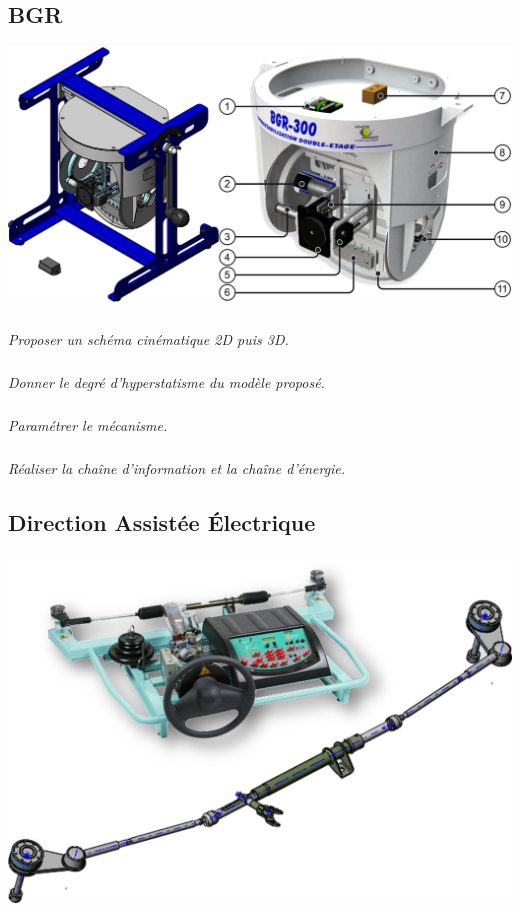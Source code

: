 \documentclass[10pt,fleqn]{article} %
\begin{document}

\vspace{4.5cm}
\pagestyle{fancy}
\thispagestyle{plain}


\def\columnseprulecolor{\color{ocre}}
\setlength{\columnseprule}{0.4pt} 

\begin{multicols}{2}
\subsection*{BGR}
\setcounter{exo}{0}

\begin{center}
\includegraphics[width=\linewidth]{images/bgr_01}
\end{center}

\subparagraph{}
\textit{Proposer un schéma cinématique 2D puis 3D.}

\subparagraph{}
\textit{Donner le degré d’hyperstatisme du modèle proposé.}


\subparagraph{}
\textit{Paramétrer le mécanisme.}


\subparagraph{}
\textit{Réaliser la chaîne d'information et la chaîne d'énergie.}






\subsection*{Direction Assistée Électrique}
\setcounter{exo}{0}
\begin{center}
\includegraphics[width=\linewidth]{images/dae_02}
\end{center}


\end{multicols}
\end{document}
